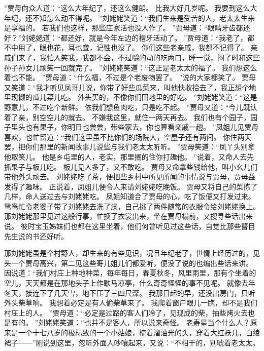 ”贾母向众人道：“这么大年纪了，还这么健朗。
比我大好几岁呢。
我要到这么大年纪，还不知怎么动不得呢。
”刘姥姥笑道：“我们生来是受苦的人，老太太生来是享福的。
若我们也这样，那些庄家活也没人作了。
”贾母道：“眼睛牙齿都还好？”刘姥姥道：“都还好，就是今年左边的槽牙活动了。
”贾母道：“我老了，都不中用了，眼也花，耳也聋，记性也没了。
你们这些老亲戚，我都不记得了。
亲戚们来了，我怕人笑我，我都不会，不过嚼的动的吃两口，睡一觉，闷了时和这些孙子孙女儿顽笑一回就完了。
”刘姥姥笑道：“这正是老太太的福了。
我们想这么着也不能。
”贾母道：“什么福，不过是个老废物罢了。
”说的大家都笑了。
贾母又笑道：“我才听见凤哥儿说，你带了好些瓜菜来，叫他快收拾去了，我正想个地里现撷的瓜儿菜儿吃。
外头买的，不像你们田地里的好吃。
”刘姥姥笑道：“这是野意儿，不过吃个新鲜。
依我们想鱼肉吃，只是吃不起。
”贾母又道：“今儿既认着了亲，别空空儿的就去。
不嫌我这里，就住一两天再去。
我们也有个园子，园子里头也有果子，你明日也尝尝，带些家去，你也算看亲戚一趟。
”凤姐儿见贾母喜欢，也忙留道：“我们这里虽不比你们的场院大，空屋子还有两间。
你住两天罢，把你们那里的新闻故事儿说些与我们老太太听听。
”贾母笑道：“凤丫头别拿他取笑儿。
他是乡屯里的人，老实，那里搁的住你打趣他。
”说着，又命人去先抓果子与板儿吃。
板儿见人多了，又不敢吃。
贾母又命拿些钱给他，叫小幺儿们带他外头顽去。
刘姥姥吃了茶，便把些乡村中所见所闻的事情说与贾母，贾母益发得了趣味。
正说着，凤姐儿便令人来请刘姥姥吃晚饭。
贾母又将自己的菜拣了几样，命人送过去与刘姥姥吃。
凤姐知道合了贾母的心，吃了饭便又打发过来。
鸳鸯忙令老婆子带了刘姥姥去洗了澡，自己挑了两件随常的衣服令给刘姥姥换上。
那刘姥姥那里见过这般行事，忙换了衣裳出来，坐在贾母榻前，又搜寻些话出来说。
彼时宝玉姊妹们也都在这里坐着，他们何曾听见过这些话，自觉比那些瞽目先生说的书还好听。
\par
那刘姥姥虽是个村野人，却生来的有些见识，况且年纪老了，世情上经历过的，见头一个贾母高兴，第二见这些哥儿姐儿们都爱听，便没了说的也编出些话来讲。
因说道：“我们村庄上种地种菜，每年每日，春夏秋冬，风里雨里，那有个坐着的空儿，天天都是在那地头子上作歇马凉亭，什么奇奇怪怪的事不见呢。
就像去年冬天，接连下了几天雪，地下压了三四尺深。
我那日起的早，还没出房门，只听外头柴草响。
我想着必定是有人偷柴草来了。
我爬着窗户眼儿一瞧，却不是我们村庄上的人。
”贾母道：“必定是过路的客人们冷了，见现成的柴，抽些烤火去也是有的。
”刘姥姥笑道：“也并不是客人，所以说来奇怪。
老寿星当个什么人？原来是一个十七八岁的极标致的一个小姑娘，梳着溜油光的头，穿着大红袄儿，白绫裙子——”刚说到这里，忽听外面人吵嚷起来，又说：“不相干的，别唬着老太太。
